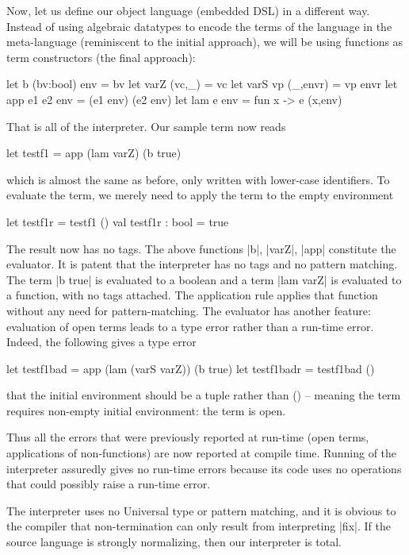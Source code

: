 \documentclass[preprint]{sigplanconf}
\begin{document}
Now, let us define our object language (embedded DSL) in a different
way. Instead of using algebraic datatypes to encode the terms of the
language in the meta-language (reminiscent to the initial approach),
we will be using functions as term constructors (the final approach):

\begin{code}
  let b (bv:bool) env = bv
  let varZ (vc,_) = vc
  let varS vp (_,envr) = vp envr
  let app e1 e2 env = (e1 env) (e2 env)
  let lam e env = fun x -> e (x,env)
\end{code}

That is all of the interpreter. Our sample term now reads
\begin{code}
  let testf1 = app (lam varZ) (b true)
\end{code}
which is almost the same as before, only written with lower-case
identifiers. To evaluate the term, we merely need to apply 
the term to the empty environment

\begin{code}
  let testf1r = testf1 ()
  val testf1r : bool = true
\end{code}

The result now has no tags. The above functions |b|,
|varZ|, |app| constitute the evaluator. It is patent that the
interpreter has no tags and no pattern matching. The term |b true| is
evaluated to a boolean and a term |lam varZ| is evaluated to a
function, with no tags attached. The application rule applies that
function without any need for pattern-matching. The evaluator has
another feature: evaluation of open terms leads to a type error rather
than a run-time error. Indeed, the following gives a type error

\begin{code}
  let testf1bad = app (lam (varS varZ)) (b true)
  let testf1badr = testf1bad ()
\end{code}
that the initial environment should be a tuple rather than () --
meaning the term requires non-empty initial environment: the term is
open.

Thus all the errors that were previously reported at run-time (open terms,
applications of non-functions) are now reported at compile
time. Running of the interpreter assuredly gives no run-time errors
because its code uses no operations that could possibly raise a
run-time error.



The interpreter uses no Universal type or pattern matching, and it
is obvious to the compiler that non-termination can only result from
interpreting |fix|.  If the source language is strongly normalizing, then
our interpreter is total.
\end{document}
